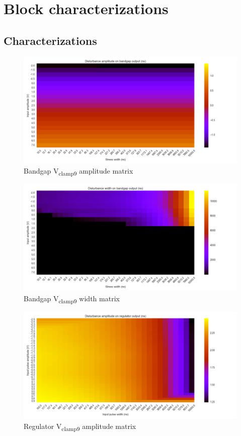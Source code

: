 \chapter{Block characterizations}
\section{Characterizations}
\label{apx:block-cz}

\begin{figure}[!h]
  \centering
  \includegraphics[width=\textwidth]{src/4/figures/bandgap_cz_v2_amplitude.png}
  \caption{Bandgap V\textsubscript{clamp9} amplitude matrix}
  \label{fig:bg_amp}
\end{figure}

\begin{figure}[!h]
  \centering
  \includegraphics[width=\textwidth]{src/4/figures/bandgap_cz_v2_width.png}
  \caption{Bandgap V\textsubscript{clamp9} width matrix}
  \label{fig:bg_width}
\end{figure}

\begin{figure}[!h]
  \centering
  \includegraphics[width=\textwidth]{src/4/figures/regulator_cz_v2_amplitude.png}
  \caption{Regulator V\textsubscript{clamp9} amplitude matrix}
  \label{fig:regu_amp}
\end{figure}

